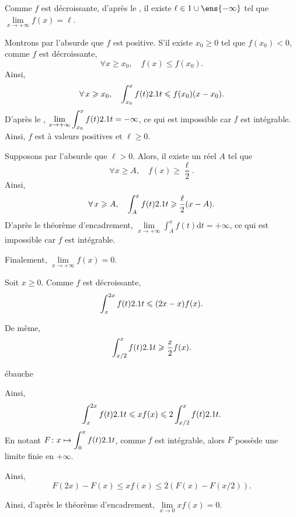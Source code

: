 \begin{elemsolution}
\begin{reponses}
\item Comme $f$ est décroissante, d'après le , il existe $\ell \in \R \cup \ens{-\infty}$ tel que $\lim\limits_{x\to+\infty} f(x) = \ell$.

\item Montrons par l'absurde que $f$ est positive. S'il existe $x_0 \geqslant 0$ tel que $f(x_0) < 0$, comme $f$ est décroissante,
\[
\forall x \geqslant x_0,\quad f(x) \leqslant f(x_0).
\]
Ainsi,
\[
\forall x \geqslant x_0,\quad \displaystyle\int_{x_0}^x f(t) \d t \leqslant f(x_0) (x - x_0).
\]
D'après le , $\lim\limits_{x\to+\infty} \displaystyle\int_{x_0}^x f(t) \d t = -\infty$, ce qui est impossible car $f$ est intégrable. Ainsi, $f$ est à valeurs positives et $\ell \geqslant 0$.

\item Supposons par l'absurde que $\ell > 0$. Alors, il existe un réel $A$ tel que
\[
\forall x \geqslant A,\quad f(x) \geqslant \frac{\ell}{2}.
\]
Ainsi,
\[
\forall x \geqslant A,\quad \displaystyle\int_A^x f(t) \d t \geqslant \frac{\ell}{2} (x - A).
\]
D'après le théorème d'encadrement, $\lim\limits_{x\to+\infty} \displaystyle\int_A^x f(t) \mathrm{d}t = +\infty$, ce qui est impossible car $f$ est intégrable.

Finalement, $\lim\limits_{x\to+\infty} f(x) = 0$.

\item Soit $x \geqslant 0$. Comme $f$ est décroissante,
\[
\int_x^{2 x} f(t) \d t \leqslant (2 x - x) f(x).
\]

De même,
\[
\int_{x/2}^x f(t) \d t \geqslant \frac{x}{2} f(x).
\]

\begin{marginfigure}
    \centering
    \caption{ébauche}
\end{marginfigure}


Ainsi,
\[
\int_x^{2 x} f(t) \d t \leqslant x f(x) \leqslant 2 \int_{x/2}^x f(t) \d t.
\]
En notant $\fonctionligne[F]{x}{\displaystyle\int_0^x f(t) \d t}$, comme $f$ est intégrable, alors $F$ possède une limite finie en $+\infty$.

Ainsi,
\[
F(2 x) - F(x) \leqslant x f(x) \leqslant 2 (F(x) - F(x/2)).
\]

Ainsi, d'après le théorème d'encadrement, $\lim\limits_{x\to 0} x f(x) = 0$.
\end{reponses}
\end{elemsolution}

